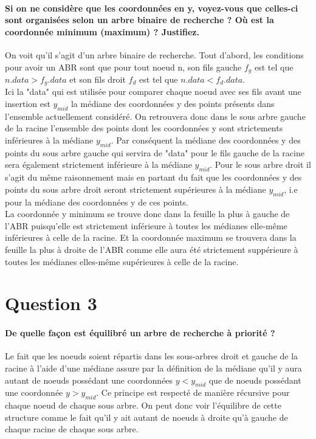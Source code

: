 \documentclass{article}
\begin{document}
    \paragraph{Si on ne considère que les coordonnées en y, voyez-vous que celles-ci sont organisées selon
    un arbre binaire de recherche ? Où est la coordonnée minimum (maximum) ? Justifiez.}
    On voit qu'il s'agit d'un arbre binaire de recherche. Tout d'abord, les conditions pour avoir un ABR sont que pour tout noeud n, son fils gauche $f_g$ est 
    tel que $n.data > f_g.data$ et son fils droit $f_d$ est tel que $n.data < f_d.data$. \\
    Ici la "data" qui est utilisée pour comparer chaque noeud avec ses fils avant une insertion est $y_{mid}$ la médiane des coordonnées y des points
    présents dans l'ensemble actuellement considéré. On retrouvera donc dans le sous arbre gauche de la racine l'ensemble des points dont les coordonnées
    y sont strictements inférieures à la médiane $y_{mid}$. Par conséquent la médiane des coordonnées y des points du sous arbre gauche qui servira
    de "data" pour le fils gauche de la racine sera également strictement inférieure à la médiane $y_{mid}$. Pour le sous arbre droit il s'agit du même raisonnement
    mais en partant du fait que les coordonnées y des points du sous arbre droit seront strictement supérieures à la médiane $y_{mid}$, i.e pour la médiane des coordonnées
    y de ces points. \\
    La coordonnée y minimum se trouve donc dans la feuille la plus à gauche de l'ABR puisqu'elle est strictement inférieure à toutes les médianes elle-même inférieures
    à celle de la racine. Et la coordonnée maximum se trouvera dans la feuille la plus à droite de l'ABR comme elle aura été strictement suppérieure à toutes
    les médianes elles-même supérieures à celle de la racine.

\newpage
\section{Question 3}
    \paragraph{De quelle façon est équilibré un arbre de recherche à priorité ?}
    Le fait que les noeuds soient répartis dans les sous-arbres droit et gauche de la racine à l'aide d'une médiane assure par la définition de
    la médiane qu'il y aura autant de noeuds possédant une coordonnées $y < y_{mid}$ que de noeuds possédant une coordonnée $y > y_{mid}$.
    Ce principe est respecté de manière récursive pour chaque noeud de chaque sous arbre. On peut donc voir l'équilibre de cette structure comme le fait
    qu'il y ait autant de noeuds à droite qu'à gauche de chaque racine de chaque sous arbre.
\end{document}
